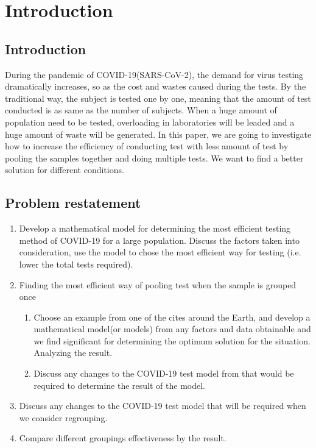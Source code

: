 \section{Introduction}
\subsection{Introduction}
During the pandemic of COVID-19(SARS-CoV-2), the demand for virus testing dramatically increases, so as the cost and wastes caused during the tests. By the traditional way, the subject is tested one by one, meaning that the amount of test conducted is as same as the number of subjects. When a huge amount of population need to be tested, overloading in laboratories will be leaded and a huge amount of waste will be generated. In this paper, we are going to investigate how to increase the efficiency of conducting test with less amount of test by pooling the samples together and doing multiple tests. We want to find a better solution for different conditions.
\subsection{Problem restatement}
\begin{enumerate}
  \item Develop a mathematical model for determining the most efficient testing method of COVID-19 for a large population. Discuss the factors taken into consideration, use the model to chose the most efficient way for testing (i.e. lower the total tests required).
  \item Finding the most efficient way of pooling test when the sample is grouped once
    \begin{enumerate}
     \item Choose an example from one of the cites around the Earth, and develop a mathematical model(or models) from any factors and data obtainable and we find significant for determining the optimum solution for the situation. Analyzing the result.
     \item Discuss any changes to the COVID-19 test model from that would be required to determine the result of the model.
    \end{enumerate}
  \item Discuss any changes to the COVID-19 test model that will be required when we consider regrouping.
  \item Compare different groupings effectiveness by the result.
\end{enumerate}